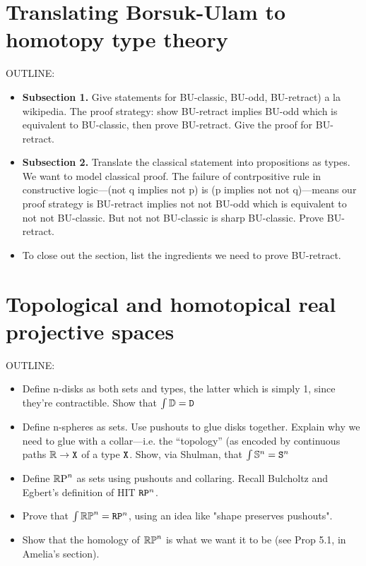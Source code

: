 \documentclass{amsart}
\begin{document}
\section{Translating Borsuk-Ulam to homotopy type theory}
\label{sec:bu-to-hott}

OUTLINE:
\begin{itemize}
\item
  \textbf{Subsection 1.} Give statements for BU-classic,
  BU-odd, BU-retract) a la wikipedia. The proof strategy:
  show BU-retract implies BU-odd which is equivalent to
  BU-classic, then prove BU-retract. Give the proof for
  BU-retract.
\item
  \textbf{Subsection 2.} Translate the classical statement
  into propositions as types. We want to model classical proof.
  The failure of contrpositive rule in constructive
  logic---(not q implies not p) is (p implies not not
  q)---means our proof strategy is BU-retract implies not
  not BU-odd which is equivalent to not not BU-classic. But
  not not BU-classic is sharp BU-classic. Prove BU-retract. 
\item
  To close out the section, list the ingredients we need to
  prove BU-retract.
\end{itemize}


\section{Topological and homotopical real projective spaces}
\label{sec:rpn}

OUTLINE:
\begin{itemize}
\item
  Define n-disks as both sets and types, the latter which is
  simply 1, since they're contractible. Show that $ \int
  \mathbb{D} = \mathtt{D} $ 
\item
  Define n-spheres as sets.  Use pushouts to glue
  disks together. Explain why we need to glue with a
  collar---i.e. the ``topology'' (as encoded by continuous
  paths $ \mathbb{R} \to \mathtt{X} $ of a type $ \mathtt{X} $. Show, via Shulman,
  that $ \int \mathbb{S}^n = \mathtt{S}^n $ 
\item
  Define $ \mathbb{R}\textrm{P}^n $ as sets using pushouts and collaring.
  Recall Bulcholtz and Egbert's definition of HIT $ \mathtt{RP}^n
  $. 
 \item
  Prove that $ \int \mathbb{RP}^n = \mathtt{RP}^n $, using an idea like "shape preserves pushouts".
\item
Show that the homology of $\mathbb{RP}^n$ is what we want it to be (see Prop 5.1, in Amelia's section).
\end{itemize}
\end{document}
